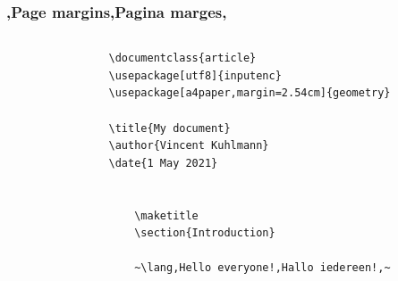 \begin{frame}[fragile]
    \frametitle{\lang,Page margins,Pagina marges,}
    \begin{columns}
        \begin{column}{0.67\textwidth}
            \begin{verbatim}
                \documentclass{article}
                \usepackage[utf8]{inputenc}
                \usepackage[a4paper,margin=2.54cm]{geometry}
                
                \title{My document}
                \author{Vincent Kuhlmann}
                \date{1 May 2021}
                
                
                    \maketitle
                    \section{Introduction}
                    
                    ~\lang,Hello everyone!,Hallo iedereen!,~
                

\end{verbatim}
\end{column}
\end{columns}
\end{frame}
